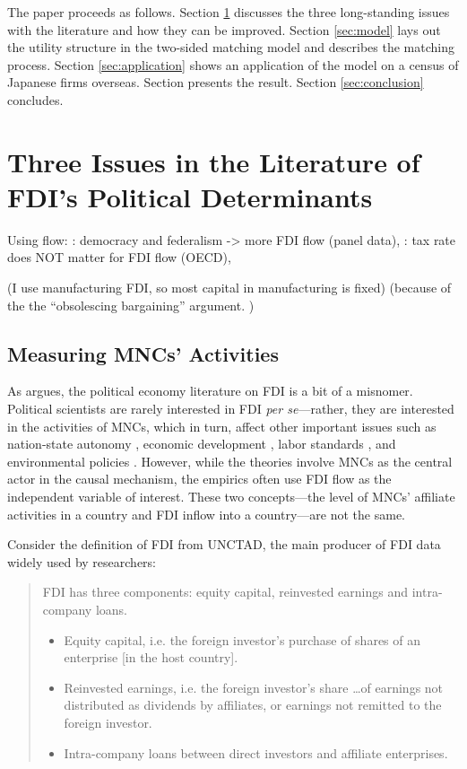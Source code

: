 The paper proceeds as follows. Section \ref{sec:literature_issues} discusses the
three long-standing issues with the literature and how they can be improved.
Section \ref{sec:model} lays out the utility structure in the two-sided matching
model and describes the matching process. Section \ref{sec:application} shows an
application of the model on a census of Japanese firms overseas. Section
presents the result. Section \ref{sec:conclusion} concludes.

\section{Three Issues in the Literature of FDI's Political Determinants}
\label{sec:literature_issues}

Using flow: \citep{Jensen2005}: democracy and federalism -> more FDI flow (panel
data), \citep{Jensen2008}: tax rate does NOT matter for FDI flow (OECD),
\citep{Busse2007}

(I use manufacturing FDI, so most capital in manufacturing is fixed) (because of
the the ``obsolescing bargaining'' argument. )


\subsection{Measuring MNCs' Activities}

As \citet{Kerner2004} argues, the political economy literature on FDI is a bit
of a misnomer. Political scientists are rarely interested in FDI \textit{per
se}---rather, they are interested in the activities of MNCs, which in turn,
affect other important issues such as nation-state autonomy \citep{Mosley2005},
economic development \citep{Moran1998}, labor standards \citep{Mosley2007}, and
environmental policies \citep{Prakash2007}. However, while the theories involve
MNCs as the central actor in the causal mechanism, the empirics often use FDI
flow as the independent variable of interest. These two concepts---the level of
MNCs' affiliate activities in a country and FDI inflow into a country---are not
the same.

Consider the definition of FDI from UNCTAD, the main producer of FDI data widely
used by researchers:

\begin{quote} FDI has three components: equity capital, reinvested earnings and
intra-company loans.
\begin{itemize}
\item Equity capital, i.e. the foreign investor’s purchase of shares of an
enterprise [in the host country].
\item Reinvested earnings, i.e. the foreign investor’s share \ldots of earnings
not distributed as dividends by affiliates, or earnings not remitted to the
foreign investor.
  \item Intra-company loans between direct investors and affiliate enterprises.
\end{itemize} \citep[245]{UNCTAD2007}
\end{quote}

